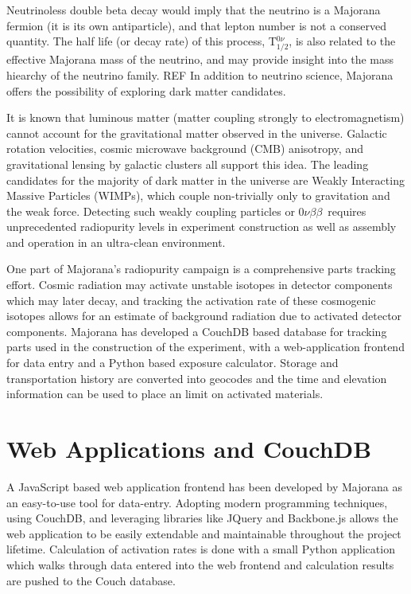 \documentclass[journal]{IEEEtran}
\def\znbb{0$\nu\beta\beta$}
\def\Tznbb{T$^{0\nu}_{1/2}$}
\begin{document}
Neutrinoless double beta decay would imply that the neutrino is a Majorana fermion (it is its own
antiparticle), and that lepton number is not a conserved quantity. 
The half life (or decay rate) of this process, \Tznbb, is also
related to the effective Majorana mass of the neutrino, and may
provide insight into the mass hiearchy of the neutrino family. REF
In addition to neutrino science, Majorana offers the possibility of exploring dark
matter candidates. 

It is known that luminous matter (matter coupling strongly to electromagnetism) 
cannot account for the gravitational matter observed in the universe. Galactic rotation
velocities, cosmic microwave background (CMB) anisotropy, and gravitational lensing by
galactic clusters all support this idea.
The leading candidates for the majority of dark matter in the universe are Weakly
Interacting Massive Particles (WIMPs), which couple non-trivially only to gravitation
and the weak force. Detecting such weakly coupling particles or \znbb\ requires unprecedented
radiopurity levels in experiment construction as well as assembly and operation in an ultra-clean
environment.

One part of Majorana's radiopurity campaign is a comprehensive parts tracking effort. Cosmic
radiation may activate unstable isotopes in detector components which may later decay, and 
tracking the activation rate of these cosmogenic isotopes allows for an estimate of background
radiation due to activated detector components. Majorana has developed a CouchDB based database
for tracking parts used in the construction of the experiment, with a web-application frontend
for data entry and a Python based exposure calculator. Storage and transportation history are
converted into geocodes and the time and elevation information can be used to place an limit
on activated materials.

\section{Web Applications and CouchDB}
A JavaScript based web application frontend has been developed by Majorana as an easy-to-use tool for data-entry.
Adopting modern programming techniques, using CouchDB, and leveraging libraries like JQuery and Backbone.js allows the
web application to be easily extendable and maintainable throughout the project lifetime. Calculation of
activation rates is done with a small Python application which walks through data entered into the web
frontend and calculation results are pushed to the Couch database.
\end{document}
